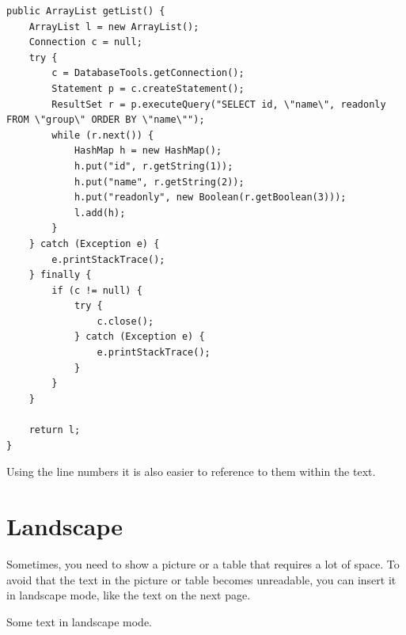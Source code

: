 \begin{lstlisting}[caption=A listing example,label=lst:listing1]
public ArrayList getList() {	
	ArrayList l = new ArrayList();
	Connection c = null;
	try {
		c = DatabaseTools.getConnection();
		Statement p = c.createStatement();
		ResultSet r = p.executeQuery("SELECT id, \"name\", readonly FROM \"group\" ORDER BY \"name\"");
		while (r.next()) {
			HashMap h = new HashMap();
			h.put("id", r.getString(1));
			h.put("name", r.getString(2));
			h.put("readonly", new Boolean(r.getBoolean(3)));
			l.add(h);
		}
	} catch (Exception e) {
		e.printStackTrace();
	} finally {
		if (c != null) {
			try {
				c.close();
			} catch (Exception e) {
				e.printStackTrace();
			}
		}
	}
	
	return l;
}
\end{lstlisting}

Using the line numbers it is also easier to reference to them within the text.

\section{Landscape}

Sometimes, you need to show a picture or a table that requires a lot of space.
To avoid that the text in the picture or table becomes unreadable, you can
insert it in landscape mode, like the text on the next page.

\begin{landscape}
Some text in landscape mode.
\end{landscape}
